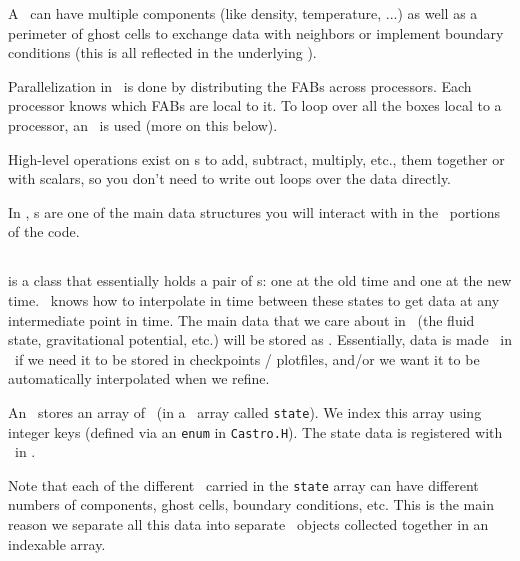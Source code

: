 A \multifab\ can have multiple components (like density, temperature,
...) as well as a perimeter of ghost cells to exchange data with
neighbors or implement boundary conditions (this is all reflected in
the underlying \farraybox).

Parallelization in \boxlib\ is done by distributing the FABs across
processors.  Each processor knows which FABs are local to it.  To loop
over all the boxes local to a processor, an \mfiter\ is used (more
on this below).

High-level operations exist on \multifab s to add, subtract, multiply,
etc., them together or with scalars, so you don't need to write out
loops over the data directly.

In \castro, \multifab s are one of the main data structures you will
interact with in the \cpp\ portions of the code.


\subsection{\statedata}

\label{soft:sec:statedata}

\code{\statedata} is a class that essentially holds a pair of \multifab s: one
at the old time and one at the new time.  \boxlib\ knows how to
interpolate in time between these states to get data at any
intermediate point in time.  The main data that we care about in
\castro\ (the fluid state, gravitational potential, etc.) will be
stored as \statedata.  Essentially, data is made \statedata\ in
\castro\ if we need it to be stored in checkpoints / plotfiles, and/or
we want it to be automatically interpolated when we refine.

An \amrlevel\ stores an array of \statedata\ (in a \cpp\ array
called {\tt state}).  We index this array using integer keys (defined
via an {\tt enum} in {\tt Castro.H}).  The state data is registered
with \boxlib\ in .

Note that each of the different \statedata\ carried in the {\tt state}
array can have different numbers of components, ghost cells, boundary
conditions, etc.  This is the main reason we separate all this data
into separate \statedata\ objects collected together in an indexable
array.

